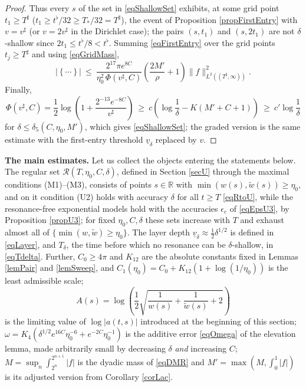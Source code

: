 \documentclass[11pt,twoside,reqno]{amsart}
\def\ti{\tilde}
\def\R{{\mathbb R}}
\def\RR{{\mathcal{R}}}
\def\d{\delta}
\def\uv{\underline{v}_{\d}}
\theoremstyle{plain}
\numberwithin{equation}{section}
\begin{document}
\begin{proof}
Thus every $s$ of the set in \eqref{eqShallowSet} exhibits, at some grid point $t_1\geq T^\sharp$ ($t_1\geq t^\flat/32\geq T_*/32=T^\sharp$), the event of Proposition \ref{propFirstEntry} with $v=v^\sharp$ (or $v=2v^\sharp$ in the Dirichlet case); the pairs $(s,t_1)$ and $(s,2t_1)$ are not $\d$-shallow since $2t_1\leq t^\flat/8<t^\flat$. Summing \eqref{eqFirstEntry} over the grid points $t_j\geq T^\sharp$ and using \eqref{eqGridMass},
$$\left|\left\{\cdots\right\}\right|\ \leq\ \frac{2^{17}\pi e^{8C}}{\eta_0^{2}\,\Phi(v^\sharp,C)}\left(\frac{2M'}\rho+1\right)\|f\|^2_{L^2((T^\sharp,\infty))} .$$
Finally,
$$\Phi(v^\sharp,C)=\frac12\log\left(1+\frac{2^{-13}e^{-8C}}{v^\sharp}\right)\ \geq\ c\left(\log\frac1\d-K(M'+C+1)\right)\ \geq\ c'\log\frac1\d$$
for $\d\leq\d_5(C,\eta_0,M')$, which gives \eqref{eqShallowSet}; the graded version is the same estimate with the first-entry threshold $\uv$ replaced by $v$.
\end{proof}

{\bf The main estimates.} Let us collect the objects entering the statements below. The regular set $\RR(T,\eta_0,C,\d)$, defined in Section \ref{secU} through the maximal conditions (M1)--(M3), consists of points $s\in\R$ with $\min\left(w(s),\ti w(s)\right)\geq\eta_0$, and on it condition (U2) holds with accuracy $\d$ for all $t\geq T$ \eqref{eqRtoU}, while the resonance-free exponential models hold with the accuracies $\epsilon_c$ of \eqref{eqEpsU3}, by Proposition \ref{propU3}; for fixed $\eta_0,C,\d$ these sets increase with $T$ and exhaust almost all of $\{\min(w,\ti w)\geq\eta_0\}$. The layer depth $\uv\approx\tfrac12\d^{1/2}$ is defined in \eqref{eqLayer}, and $T_\d$, the time before which no resonance can be $\d$-shallow, in \eqref{eqTdelta}. Further, $C_0\geq4\pi$ and $K_{12}$ are the absolute constants fixed in Lemmas \ref{lemPair} and \ref{lemSweep}, and $C_1(\eta_0)=C_0+K_{12}(1+\log(1/\eta_0))$ is the least admissible scale;
$$A(s)=\log\left(\frac12\sqrt{\frac1{w(s)}+\frac1{\ti w(s)}+2}\right)$$
is the limiting value of $\log|a(t,s)|$ introduced at the beginning of this section; $\omega=K_4(\d^{1/2} e^{16C}\eta_0^{-6}+e^{-2C}\eta_0^{-1})$ is the additive error \eqref{eqOmega} of the elevation lemma, made arbitrarily small by decreasing $\d$ {\it and} increasing $C$; $M=\sup_n\int_{2^n}^{2^{n+1}}|f|$ is the dyadic mass of \eqref{eqDMR} and $M'=\max\left(M,\int_0^1|f|\right)$ is its adjusted version from Corollary \ref{corLac}.
\end{document}
